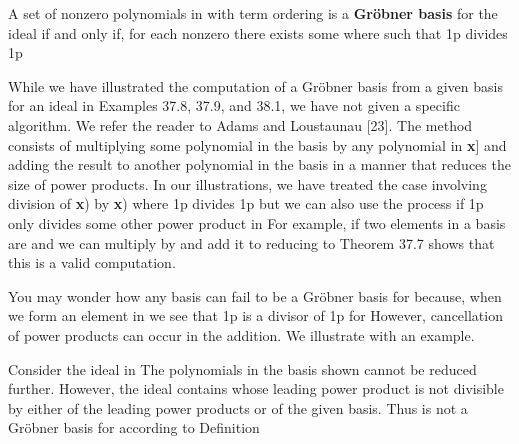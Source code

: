 \documentclass[11pt,oneside]{article}
\begin{document}
\begin{BookBody}
 A set  of nonzero polynomials in  with term ordering \BookInline{<,\allowbreak } is a\textbf{ Gröbner basis} for the ideal  if and only if, for each nonzero  there exists some  where  such that 1p divides 1p\BookEnd{\blacksquare}

While we have illustrated the computation of a Gröbner basis from a given basis for an ideal in Examples 37.8, 37.9, and 38.1, we have not given a specific algorithm. We refer the reader to Adams and Loustaunau [23]. The method consists of multiplying some polynomial in the basis by any polynomial in \BookInline{F[}\textbf{x}] and adding the result to another polynomial in the basis in a manner that reduces the size of power products. In our illustrations, we have treated the case involving division of \textbf{x}) by \textbf{x}) where 1p divides 1p but we can also use the process if 1p only divides some other power product in  For example, if two elements in a basis are  and  we can multiply  by  and add it to  reducing  to  Theorem 37.7 shows that this is a valid computation.

You may wonder how any basis  can fail to be a Gröbner basis for  because, when we form an element  in  we see that 1p is a divisor of 1p for  However, cancellation of power products can occur in the addition. We illustrate with an example.

 Consider the ideal  in \BookInline{\mathbb{R}[x,\allowbreak y\}.} The polynomials in the basis shown cannot be reduced further. However, the ideal  contains   whose leading power product  is not divisible by either of the leading power products  or  of the given basis. Thus  is not a Gröbner basis for  according to Definition \BookEnd{\blacktriangle}


\end{BookBody}
\end{document}
